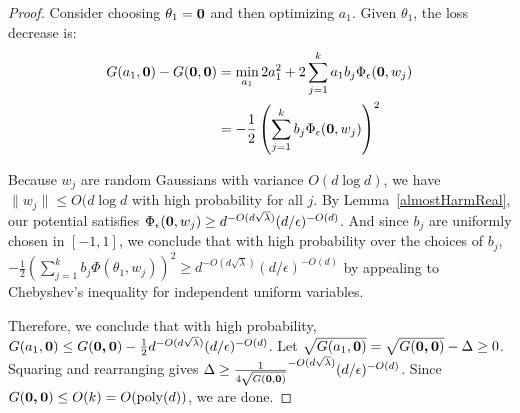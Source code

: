 \AlmostHarmInitialize*

 \begin{proof}
  Consider choosing $\theta_1 = {\bf 0}$ and then
  optimizing $a_1$. Given $\theta_1$, the loss decrease is:
%
\begin{align*}
   G(a_1,{\bf 0}) - G({\bf 0},{\bf 0}) & = \min_{a_1} 2a_1^2 +
  2\sum_{j=1}^k a_1 b_j\Phi_\epsilon({\bf 0},w_j) \\
 & = -\frac{1}{2}\left(  \sum_{j=1}^k b_j
   \Phi_\epsilon({\bf 0},w_j)\right)^2 
\end{align*}

Because $w_j$ are random Gaussians with variance $O(d \log d)$, we have $\|w_j\| \leq O(d\log d$ with high probability for all $j$. By Lemma~\ref{almostHarmReal}, our potential satisfies ${\Phi}_\epsilon({\bf 0}, w_j) \geq d^{-O(d\sqrt{\lambda})}(d/\epsilon)^{ - O(d)}$. And since $b_j$ are uniformly chosen in $[-1,1]$, we conclude that with high probability over the choices of $b_j$, $-\frac{1}{2}\left(  \sum_{j=1}^k b_j\Phi(\theta_1,w_j)\right)^2 \geq d^{-O(d\sqrt{\lambda})}(d/\epsilon)^{ - O(d)}$ by appealing to Chebyshev's inequality for independent uniform variables.

Therefore, we conclude that with high probability, $G(a_1, {\bf 0}) \leq G(\boldsymbol{0,0}) - \frac{1}{2}d^{-O(d\sqrt{\lambda})}(d/\epsilon)^{ - O(d)}$. Let $\sqrt{G(a_1, {\bf 0})} = \sqrt{G(\boldsymbol{0,0})} - \Delta \geq 0$. Squaring and rearranging gives $\Delta \geq \frac{1}{4\sqrt{G({\bf 0, 0})}}^{-O(d\sqrt{\lambda})}(d/\epsilon)^{ - O(d)}$. Since $G(\boldsymbol{0,0}) \leq O(k) = O(\mathrm{poly}(d))$, we are done. 

%
%
\end{proof}


